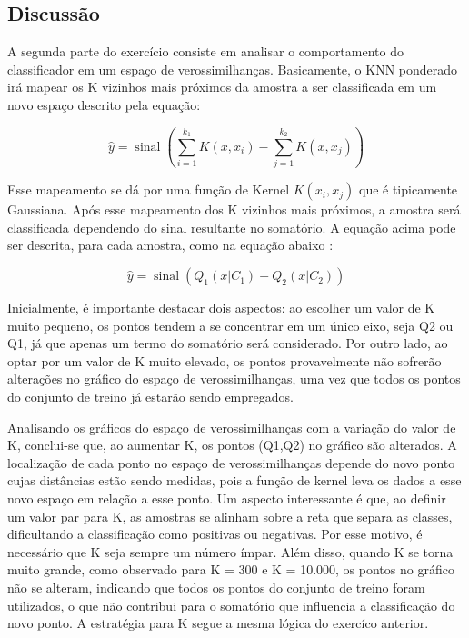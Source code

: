 \documentclass{article} %
\begin{document}
\subsection{Discussão}

\vspace{1cm}

A segunda parte do exercício consiste em analisar o comportamento do classificador em um espaço de verossimilhanças. Basicamente, o KNN ponderado irá mapear os K vizinhos mais próximos da amostra a ser classificada em um novo espaço descrito pela equação:

\[
\hat{y} = \operatorname{sinal}\left(\sum_{i=1}^{k_1} K(x, x_i) - \sum_{j=1}^{k_2} K(x, x_j)\right)
\]

Esse mapeamento se dá por uma função de Kernel \( K(x_i, x_j) \) que é tipicamente Gaussiana. Após esse mapeamento dos K vizinhos mais próximos, a amostra será classificada dependendo do sinal resultante no somatório. A equação acima pode ser descrita, para cada amostra, como na equação abaixo : 

\[
\hat{y} = \operatorname{sinal}(Q_1(x|C_1) - Q_2(x|C_2))
\]

Inicialmente, é importante destacar dois aspectos: ao escolher um valor de K muito pequeno, os pontos tendem a se concentrar em um único eixo, seja Q2 ou Q1, já que apenas um termo do somatório será considerado. Por outro lado, ao optar por um valor de K muito elevado, os pontos provavelmente não sofrerão alterações no gráfico do espaço de verossimilhanças, uma vez que todos os pontos do conjunto de treino já estarão sendo empregados. 

\vspace{1cm}

Analisando os gráficos do espaço de verossimilhanças com a variação do valor de K, conclui-se que, ao aumentar K, os pontos (Q1,Q2) no gráfico são alterados. A localização de cada ponto no espaço de verossimilhanças depende do novo ponto cujas distâncias estão sendo medidas, pois a função de kernel leva os dados a esse novo espaço em relação a esse ponto. Um aspecto interessante é que, ao definir um valor par para K, as amostras se alinham sobre a reta que separa as classes, dificultando a classificação como positivas ou negativas. Por esse motivo, é necessário que K seja sempre um número ímpar. Além disso, quando K se torna muito grande, como observado para K = 300 e K = 10.000, os pontos no gráfico não se alteram, indicando que todos os pontos do conjunto de treino foram utilizados, o que não contribui para o somatório que influencia a classificação do novo ponto. A estratégia para K segue a mesma lógica do exercíco anterior.
\end{document}
